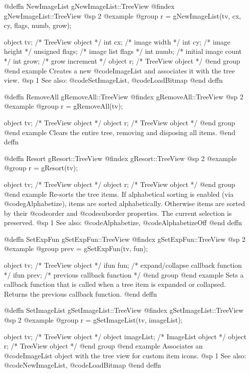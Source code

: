 @deffn {NewImageList} gNewImageList::TreeView
@findex gNewImageList::TreeView
@sp 2
@example
@group
r = gNewImageList(tv, cx, cy, flags, numb, grow);

object    tv;      /*  TreeView object      */
int       cx;      /*  image width           */
int       cy;      /*  image height          */
unsigned  flags;   /*  image list flags      */
int       numb;    /*  initial image count   */
int       grow;    /*  grow increment        */
object    r;       /*  TreeView object       */
@end group
@end example
Creates a new @code{ImageList} and associates it with the tree view.
@sp 1
See also:  @code{SetImageList}, @code{LoadBitmap}
@end deffn



@deffn {RemoveAll} gRemoveAll::TreeView
@findex gRemoveAll::TreeView
@sp 2
@example
@group
r = gRemoveAll(tv);

object  tv;   /*  TreeView object  */
object  r;    /*  TreeView object  */
@end group
@end example
Clears the entire tree, removing and disposing all items.
@end deffn



@deffn {Resort} gResort::TreeView
@findex gResort::TreeView
@sp 2
@example
@group
r = gResort(tv);

object  tv;   /*  TreeView object  */
object  r;    /*  TreeView object  */
@end group
@end example
Re-sorts the tree items.  If alphabetical sorting is enabled (via
@code{gAlphabetize}), items are sorted alphabetically.  Otherwise items
are sorted by their @code{order} and @code{suborder} properties.  The
current selection is preserved.
@sp 1
See also:  @code{Alphabetize}, @code{AlphabetizeOff}
@end deffn



@deffn {SetExpFun} gSetExpFun::TreeView
@findex gSetExpFun::TreeView
@sp 2
@example
@group
prev = gSetExpFun(tv, fun);

object  tv;     /*  TreeView object                        */
ifun    fun;    /*  expand/collapse callback function       */
ifun    prev;   /*  previous callback function              */
@end group
@end example
Sets a callback function that is called when a tree item is expanded or
collapsed.  Returns the previous callback function.
@end deffn



@deffn {SetImageList} gSetImageList::TreeView
@findex gSetImageList::TreeView
@sp 2
@example
@group
r = gSetImageList(tv, imageList);

object  tv;          /*  TreeView object     */
object  imageList;   /*  ImageList object    */
object  r;           /*  TreeView object     */
@end group
@end example
Associates an @code{ImageList} object with the tree view for custom item
icons.
@sp 1
See also:  @code{NewImageList}, @code{LoadBitmap}
@end deffn




